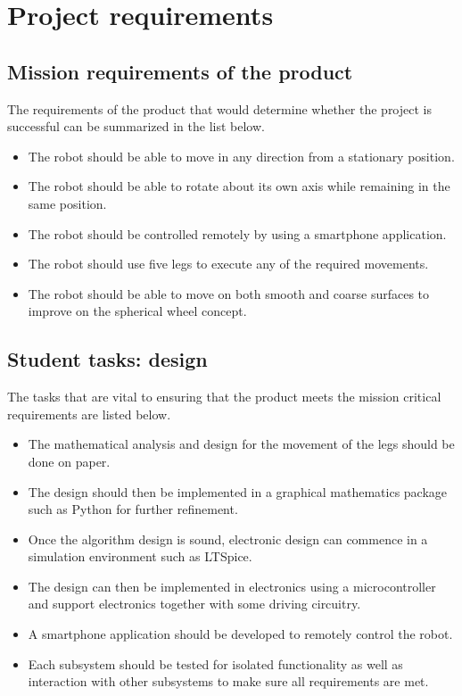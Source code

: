 
\section{Project requirements}


\subsection{Mission requirements of the product}The requirements of the product that would determine whether the project is successful can be summarized in the list below.
\begin{itemize}
\item The robot should be able to move in any direction from a stationary position.
\item The robot should be able to rotate about its own axis while remaining in the same position.
\item The robot should be controlled remotely by using a smartphone application.
\item The robot should use five legs to execute any of the required movements.
\item The robot should be able to move on both smooth and coarse surfaces to improve on the spherical wheel concept.
\end{itemize}

\subsection{Student tasks: design}
The tasks that are vital to ensuring that the product meets the mission critical requirements are listed below.
\begin{itemize}
\item The mathematical analysis and design for the movement of the legs should be done on paper.
\item The design should then be implemented in a graphical mathematics package such as Python for further refinement.
\item Once the algorithm design is sound, electronic design can commence in a simulation environment such as LTSpice.
\item The design can then be implemented in electronics using a microcontroller and support electronics together with some driving circuitry.
\item A smartphone application should be developed to remotely control the robot.
\item Each subsystem should be tested for isolated functionality as well as interaction with other subsystems to make sure all requirements are met. 
\end{itemize}

